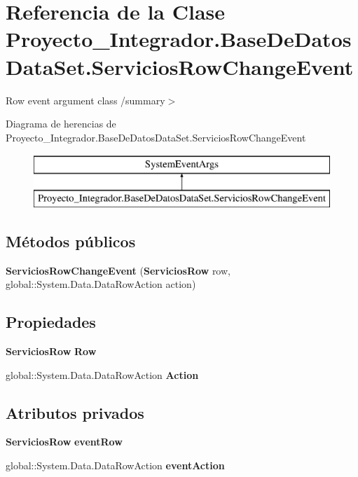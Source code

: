 \section{Referencia de la Clase Proyecto\-\_\-\-Integrador.\-Base\-De\-Datos\-Data\-Set.\-Servicios\-Row\-Change\-Event}
\label{class_proyecto___integrador_1_1_base_de_datos_data_set_1_1_servicios_row_change_event}


Row event argument class /summary$>$  


Diagrama de herencias de Proyecto\-\_\-\-Integrador.\-Base\-De\-Datos\-Data\-Set.\-Servicios\-Row\-Change\-Event\begin{figure}[H]
\begin{center}
\leavevmode
\includegraphics[height=2.000000cm]{class_proyecto___integrador_1_1_base_de_datos_data_set_1_1_servicios_row_change_event}
\end{center}
\end{figure}
\subsection*{Métodos públicos}
\begin{DoxyCompactItemize}
\item 
{\bf Servicios\-Row\-Change\-Event} ({\bf Servicios\-Row} row, global\-::\-System.\-Data.\-Data\-Row\-Action action)
\end{DoxyCompactItemize}
\subsection*{Propiedades}
\begin{DoxyCompactItemize}
\item 
{\bf Servicios\-Row} {\bf Row}\hspace{0.3cm}{\ttfamily  [get]}
\item 
global\-::\-System.\-Data.\-Data\-Row\-Action {\bf Action}\hspace{0.3cm}{\ttfamily  [get]}
\end{DoxyCompactItemize}
\subsection*{Atributos privados}
\begin{DoxyCompactItemize}
\item 
{\bf Servicios\-Row} {\bf event\-Row}
\item 
global\-::\-System.\-Data.\-Data\-Row\-Action {\bf event\-Action}
\end{DoxyCompactItemize}



